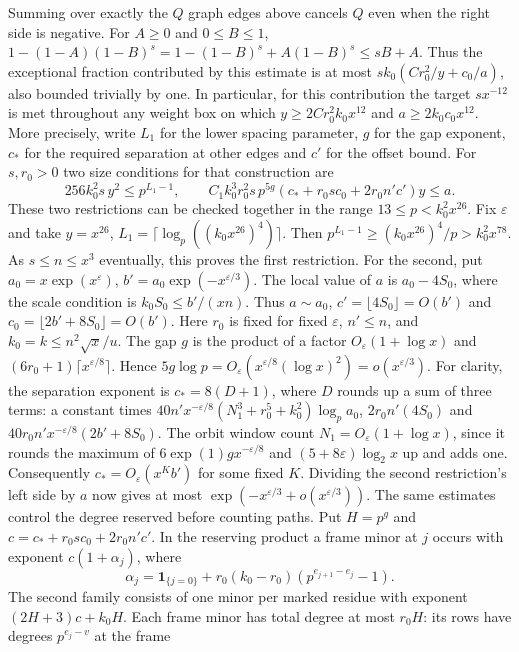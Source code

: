 \documentclass[11pt]{amsart}
\theoremstyle{definition}
\theoremstyle{remark}
\begin{document}
Summing over exactly
the $Q$ graph edges above cancels $Q$ even when the right side
is negative. For $A\ge0$ and $0\le B\le1$,
$1-(1-A)(1-B)^s=1-(1-B)^s+A(1-B)^s\le sB+A$.
Thus the exceptional fraction contributed by this estimate is at
most $s k_0(Cr_0^2/y+c_0/a)$, also bounded trivially by one.
In particular, for this contribution the target $s x^{-12}$
is met throughout any weight box on which
$y\ge2C r_0^2 k_0 x^{12}$ and $a\ge2k_0c_0x^{12}$.
More precisely, write $L_1$ for the lower spacing parameter,
$g$ for the gap exponent, $c_*$ for the required separation
at other edges and $c'$ for the offset bound. For $s,r_0>0$
two size conditions for that construction are
\[
 256 k_0^2 s\,y^2\le p^{L_1-1},\qquad
 C_1 k_0^3 r_0^2 s\,p^{5g}
 (c_*+r_0s c_0+2r_0 n'c')y\le a .
\]
These two restrictions can be checked together in the range
$13\le p<k_0^2x^{26}$. Fix $\varepsilon$ and take $y=x^{26}$,
$L_1=\lceil\log_p((k_0x^{26})^4)\rceil$. Then
$p^{L_1-1}\ge (k_0x^{26})^4/p>k_0^2x^{78}$. As $s\le n\le x^3$
eventually, this proves the first restriction. For the second, put
$a_0=x\exp(x^\varepsilon)$, $b'=a_0\exp(-x^{\varepsilon/3})$.
The local value of $a$ is $a_0-4S_0$, where the scale condition is
$k_0S_0\le b'/(xn)$. Thus $a\sim a_0$,
$c'=\lfloor4S_0\rfloor=O(b')$ and
$c_0=\lfloor2b'+8S_0\rfloor=O(b')$. Here $r_0$ is fixed for
fixed $\varepsilon$, $n'\le n$, and $k_0=k\le n^2\sqrt{x}/u$.
The gap $g$ is the product of a factor $O_\varepsilon(1+\log x)$
and $(6r_0+1)\lceil x^{\varepsilon/8}\rceil$. Hence
$5g\log p=O_\varepsilon(x^{\varepsilon/8}(\log x)^2)
=o(x^{\varepsilon/3})$. For clarity, the separation exponent is
$c_*=8(D+1)$, where $D$ rounds up a sum of three terms: a constant
times $40n'x^{-\varepsilon/8}(N_1^3+r_0^5+k_0^2)\log_p a_0$,
$2r_0n'(4S_0)$ and $40r_0n'x^{-\varepsilon/8}(2b'+8S_0)$.
The orbit window count $N_1=O_\varepsilon(1+\log x)$, since it
rounds the maximum of $6\exp(1)g x^{-\varepsilon/8}$ and
$(5+8\varepsilon)\log_2 x$ up and adds one. Consequently
$c_*=O_\varepsilon(x^K b')$ for some fixed $K$. Dividing the
second restriction's left side by $a$ now gives at most
$\exp(-x^{\varepsilon/3}+o(x^{\varepsilon/3}))$.
The same estimates control the degree reserved before counting
paths. Put $H=p^g$ and
$c=c_*+r_0s c_0+2r_0n'c'$. In the reserving product a frame
minor at $j$ occurs with exponent $c(1+\alpha_j)$, where
\[
 \alpha_j=\mathbf1_{\{j=0\}}+
 r_0(k_0-r_0)(p^{e_{j+1}-e_j}-1).
\]
The second family consists of one minor per marked residue with
exponent $(2H+3)c+k_0H$. Each frame minor has total degree at
most $r_0H$: its rows have degrees $p^{e_j-v}$ at the frame
\end{document}
